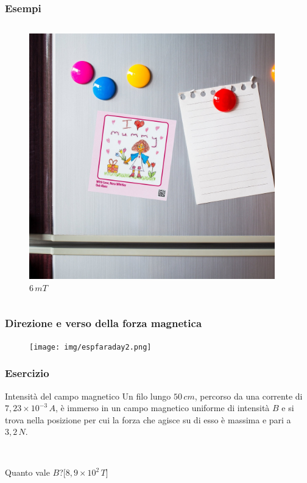 \documentclass[]{beamer}
\theoremstyle{plain}
\begin{document}
\begin{frame}
\frametitle{Esempi}
\begin{columns}
\begin{column}{0.4\textwidth}
\begin{figure}
\includegraphics[width=\columnwidth]{img/frigo.jpg}
$ 6 \, mT $
\end{figure}
\end{column}
\begin{column}{0.4\textwidth}
\end{column}
\end{columns}
\end{frame}





\begin{frame}
\frametitle{Direzione e verso della forza magnetica}
\begin{figure}
\texttt{[image: img/espfaraday2.png]}
\end{figure}
\end{frame}


\begin{frame}
\frametitle{Esercizio}
\begin{exampleblock}{Intensità del campo magnetico}
  Un filo lungo $ 50 \, cm $, percorso da una corrente di $ 7,23 \times 10^{-3} \, A $, è immerso in un campo magnetico uniforme di intensità $ B $ e si trova nella posizione per cui la forza che agisce su di esso è massima e pari a $ 3,2 \, N $.

  ~

  Quanto vale $ B $?\hspace{\fill}[$ 8,9 \times 10^{2} \, T $]
\end{exampleblock} 
\end{frame}
\end{document}
